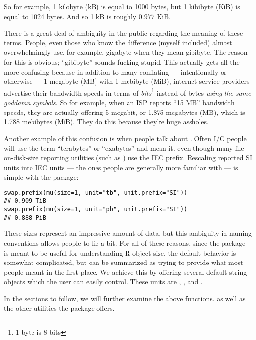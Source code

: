 So for example, 1 kilobyte (kB) is equal to 1000 bytes, but 1 kibibyte (KiB) is equal to 1024 bytes.  And so 1 kB is roughly $0.977$ KiB.

There is a great deal of ambiguity in the public regarding the meaning of these terms.  People, even those who know the difference (myself included) almost overwhelmingly use, for example, gigabyte when they mean gibibyte.  The reason for this is obvious; ``gibibyte'' sounds fucking stupid.  This actually gets all the more confusing because in addition to many conflating --- intentionally or otherwise --- 1 megabyte (MB) with 1 mebibyte (MiB), internet service providers advertise their bandwidth speeds in terms of \emph{bits}\footnote{1 byte is 8 bits} instead of bytes \emph{using the same goddamn symbols}.  So for example, when an ISP reports ``15 MB'' bandwidth speeds, they are actually offering 5 megabit, or  1.875 megabytes (MB), which is 1.788 mebibytes (MiB).  They do this because they're huge assholes.

Another example of this confusion is when people talk about .  Often I/O people will use the term ``terabytes'' or ``exabytes'' and mean it, even though many file-on-disk-size reporting utilities (such as ) use the IEC prefix.  Rescaling reported SI units into IEC units --- the ones people are generally more familiar with --- is simple with the  package:
\begin{lstlisting}[language=rr]
swap.prefix(mu(size=1, unit="tb", unit.prefix="SI"))
## 0.909 TiB
swap.prefix(mu(size=1, unit="pb", unit.prefix="SI"))
## 0.888 PiB
\end{lstlisting}

These sizes represent an impressive amount of data, but this ambiguity in naming conventions allows people to lie a bit.  For all of these reasons, since the package is meant to be useful for understanding R object size, the default behavior is somewhat complicated, but can be summarized as trying to provide what most people meant in the first place.  We achieve this by offering several default string objects which the user can easily control.  These units are , , and .  

In the sections to follow, we will further examine the above  functions, as well as the other utilities the package offers.
